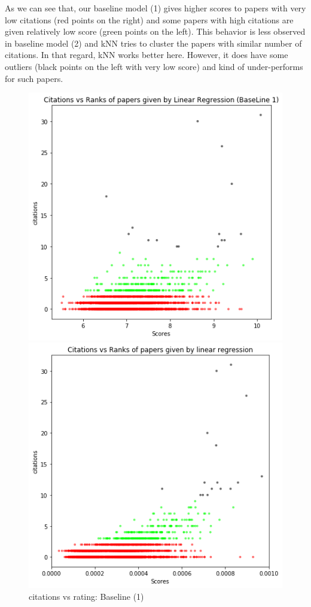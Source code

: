 \documentclass[a4paper, 11pt]{article}
\begin{document}
\vspace{0.5cm}

As we can see that, our baseline model (1) gives higher scores to papers with very low citations (red points on the right) and some papers with high citations are given relatively low score (green points on the left). This behavior is less observed in baseline model (2) and kNN tries to cluster the papers with similar number of citations. In that regard, kNN works better here. However, it does have some outliers (black points on the left with very low score) and kind of under-performs for such papers.

\begin{figure}[!htb] 
  \includegraphics[width=\linewidth]{citation_rank_lr_old.png}
     \caption{citations vs rating: Baseline (1)}
    \label{fig:citation_rank_lr_old}
\endminipage\hfill
{}
    \includegraphics[width=\linewidth]{citation_rank_lr.png}

\end{figure}
\end{document}
